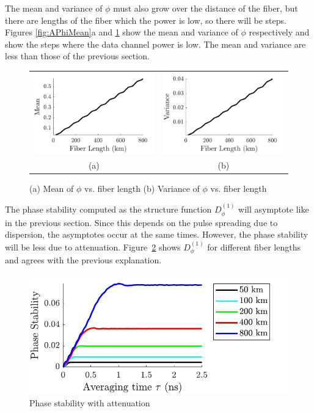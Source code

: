 The mean and variance of $\phi$ must also grow over the distance of the fiber, but there are lengths of the fiber which the power is low, so there will be steps. Figures \ref{fig:APhiMean}a and \ref{fig:APhiVar} show the mean and variance of $\phi$ respectively and show the steps where the data channel power is low. The mean and variance are less than those of the previous section.
%
\begin{figure}[htb]
	\begin{tabular}{c c}
		\includegraphics[width=0.5\linewidth]{img/APhiMean} & \includegraphics[width=0.5\linewidth]{img/APhiVar} \\
		(a) & (b)
	\end{tabular}
	\caption{(a)\label{fig:APhiMean} Mean of $\phi$ vs. fiber length (b)\label{fig:APhiVar} Variance of $\phi$ vs. fiber length}
\end{figure}
%

The phase stability computed as the structure function $D^{(1)}_\phi$ will asymptote like in the previous section. Since this depends on the pulse spreading due to dispersion, the asymptotes occur at the same times. However, the phase stability will be less due to attenuation. Figure~\ref{fig:APhaseStability} shows $D^{(1)}_\phi$ for different fiber lengths and agrees with the previous explanation.
%
\begin{figure}[htb]
	\centering
	\includegraphics{img/APhaseStability}
	\caption{Phase stability with attenuation} \label{fig:APhaseStability}
\end{figure}
%

